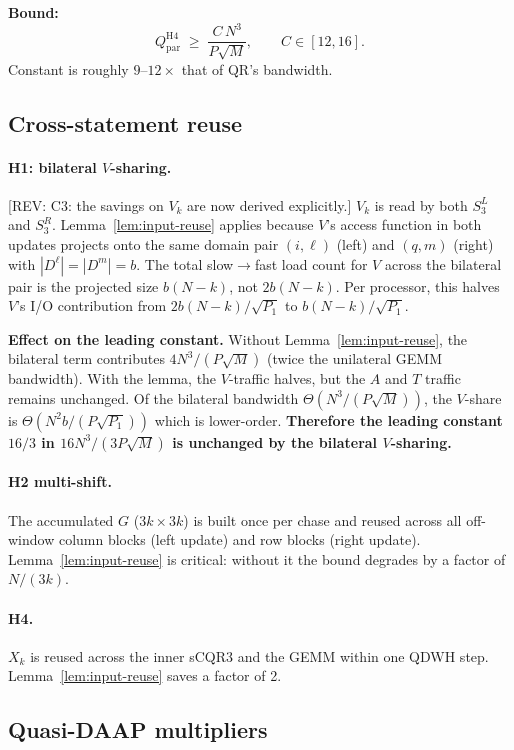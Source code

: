 \documentclass[11pt]{article}
\newcommand{\REV}[1]{\textcolor{blue!60!black}{\small\textsf{[REV: #1]}}}
\begin{document}
\textbf{Bound:}
\[
  Q_{\mathrm{par}}^{\mathrm{H4}}
  \;\ge\; \frac{C\,N^3}{P\sqrt{M}},
  \qquad C \in [12, 16].
\]
Constant is roughly $9$--$12\times$ that of QR's bandwidth.

\subsection{Cross-statement reuse}
\label{sec:B2d}

\paragraph{H1: bilateral $V$-sharing.}
\REV{C3: the savings on $V_k$ are now derived explicitly.}
$V_k$ is read by both $S_3^L$ and $S_3^R$. Lemma~\ref{lem:input-reuse}
applies because $V$'s access function in both updates projects onto
the same domain pair $(i,\ell)$ (left) and $(q,m)$ (right) with
$|D^\ell| = |D^m| = b$. The total slow$\to$fast load count for $V$
across the bilateral pair is the projected size $b(N-k)$, not
$2b(N-k)$. Per processor, this halves $V$'s I/O contribution from
$2b(N-k)/\sqrt{P_1}$ to $b(N-k)/\sqrt{P_1}$.

\textbf{Effect on the leading constant.} Without Lemma~\ref{lem:input-reuse},
the bilateral term contributes $4 N^3/(P\sqrt{M})$ (twice the unilateral
GEMM bandwidth). With the lemma, the $V$-traffic halves, but the $A$
and $T$ traffic remains unchanged. Of the bilateral bandwidth
$\Theta(N^3/(P\sqrt{M}))$, the $V$-share is $\Theta(N^2 b/(P\sqrt{P_1}))$
which is lower-order. \textbf{Therefore the leading constant
$16/3$ in $16 N^3/(3 P\sqrt{M})$ is unchanged by the bilateral $V$-sharing.}

\paragraph{H2 multi-shift.}
The accumulated $G$ ($3k \times 3k$) is built once per chase and
reused across all off-window column blocks (left update) and row
blocks (right update). Lemma~\ref{lem:input-reuse} is critical:
without it the bound degrades by a factor of $N/(3k)$.

\paragraph{H4.}
$X_k$ is reused across the inner sCQR3 and the GEMM within one QDWH
step. Lemma~\ref{lem:input-reuse} saves a factor of 2.

\subsection{Quasi-DAAP multipliers}
\label{sec:B2e}
\end{document}

